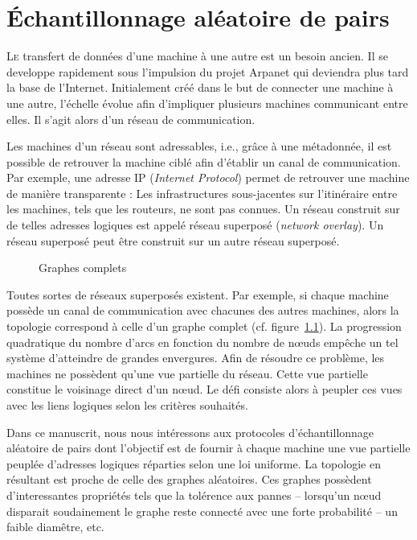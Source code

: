 
\chapter{Échantillonnage aléatoire de pairs}
\label{net:chap:rps}
\minitoc

\lettrine{L}e transfert de données d'une machine à une autre est un besoin
ancien. Il se developpe rapidement sous l'impulsion du projet Arpanet qui
deviendra plus tard la base de l'Internet. Initialement créé dans le but de
connecter une machine à une autre, l'échelle évolue afin d'impliquer plusieurs
machines communicant entre elles. Il s'agit alors d'un réseau de communication.

Les machines d'un réseau sont adressables, i.e., grâce à une métadonnée, il est
possible de retrouver la machine ciblé afin d'établir un canal de
communication. Par exemple, une adresse IP (\emph{Internet Protocol}) permet de
retrouver une machine de manière transparente : Les infrastructures
sous-jacentes sur l'itinéraire entre les machines, tels que les routeurs, ne
sont pas connues. Un réseau construit sur de telles adresses logiques est appelé
réseau superposé (\emph{network overlay}). Un réseau superposé peut être
construit sur un autre réseau superposé.

\begin{figure}
  \centering 
  
  \caption{\label{net:fig:completegraph}Graphes complets}
\end{figure}

Toutes sortes de réseaux superposés existent. Par exemple, si chaque machine
possède un canal de communication avec chacunes des autres machines, alors la
topologie correspond à celle d'un graphe complet
(cf. figure~\ref{net:fig:completegraph}). La progression quadratique du nombre
d'arcs en fonction du nombre de nœuds empêche un tel système d'atteindre de
grandes envergures. Afin de résoudre ce problème, les machines ne possèdent
qu'une vue partielle du réseau. Cette vue partielle constitue le voisinage
direct d'un nœud. Le défi consiste alors à peupler ces vues avec les liens
logiques selon les critères souhaités.

Dans ce manuscrit, nous nous intéressons aux protocoles d'échantillonnage
aléatoire de pairs dont l'objectif est de fournir à chaque machine une vue
partielle peuplée d'adresses logiques réparties selon une loi uniforme. La
topologie en résultant est proche de celle des graphes aléatoires. Ces graphes
possèdent d'interessantes propriétés tels que la tolérence aux pannes --
lorsqu'un nœud disparait soudainement le graphe reste connecté avec une forte
probabilité -- un faible diamêtre, etc.

